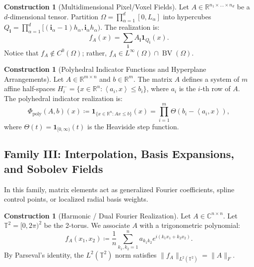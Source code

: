 \documentclass[11pt,a4paper,reqno]{amsart}
\theoremstyle{definition}
\newtheorem{construction}[theorem]{Construction}
\numberwithin{equation}{section}
\newcommand{\R}{\mathbb{R}}
\newcommand{\C}{\mathbb{C}}
\newcommand{\Tor}{\mathbb{T}}
\newcommand{\BV}{\operatorname{BV}}
\newcommand{\inner}[2]{\left\langle #1, #2 \right\rangle}
\begin{document}
\begin{construction}[Multidimensional Pixel/Voxel Fields]
Let $A \in \R^{n_1 \times \dots \times n_d}$ be a $d$-dimensional tensor. Partition $\Omega = \prod_{\alpha=1}^d [0, L_\alpha]$ into hypercubes $Q_{\mathbf{i}} = \prod_{\alpha=1}^d [(\mathbf{i}_\alpha-1) h_\alpha, \mathbf{i}_\alpha h_\alpha)$. The realization is:
\begin{equation}
    f_A(x) = \sum_{\mathbf{i}} A_{\mathbf{i}} \mathbf{1}_{Q_{\mathbf{i}}}(x).
\end{equation}
Notice that $f_A \notin C^0(\Omega)$; rather, $f_A \in L^\infty(\Omega) \cap \BV(\Omega)$.
\end{construction}

\begin{construction}[Polyhedral Indicator Functions and Hyperplane Arrangements]
Let $A \in \R^{m \times n}$ and $b \in \R^m$. The matrix $A$ defines a system of $m$ affine half-spaces $H_i^- = \{x \in \R^n \colon \inner{a_i}{x} \le b_i\}$, where $a_i$ is the $i$-th row of $A$. The polyhedral indicator realization is:
\begin{equation}
    \Phi_{\mathrm{poly}}(A, b)(x) \coloneqq \mathbf{1}_{\{x \in \R^n \colon Ax \le b\}}(x) = \prod_{i=1}^m \Theta(b_i - \inner{a_i}{x}),
\end{equation}
where $\Theta(t) = \mathbf{1}_{[0, \infty)}(t)$ is the Heaviside step function.
\end{construction}

\subsection{Family III: Interpolation, Basis Expansions, and Sobolev Fields}
\label{subsec:fam3}

In this family, matrix elements act as generalized Fourier coefficients, spline control points, or localized radial basis weights.

\begin{construction}[Harmonic / Dual Fourier Realization]
Let $A \in \C^{n \times n}$. Let $\Tor^2 = [0, 2\pi)^2$ be the 2-torus. We associate $A$ with a trigonometric polynomial:
\begin{equation}
    \label{eq:fourier_realization}
    f_A(x_1, x_2) \coloneqq \frac{1}{n} \sum_{k_1, k_2 = 1}^n a_{k_1 k_2} e^{i (k_1 x_1 + k_2 x_2)}.
\end{equation}
By Parseval's identity, the $L^2(\Tor^2)$ norm satisfies $\|f_A\|_{L^2(\Tor^2)} = \|A\|_F$.
\end{construction}
\end{document}
